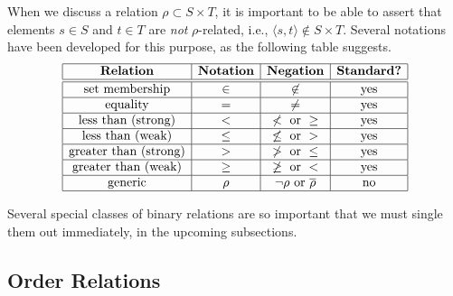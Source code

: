 \noindent
When we discuss a relation $\rho \subset S \times T$, it is important
to be able to assert that elements $s \in S$ and $t \in T$ are {\em
  not} $\rho$-related, i.e., $\langle s, t
\rangle \not\in S \times T$.  Several notations have been developed
for this purpose, as the following table suggests.
\begin{equation}
\label{eq:NOT-rho-notation}
\begin{array}{|c|c|c|c|}
\hline
\mbox{\bf Relation} & \mbox{\bf Notation} & \mbox{\bf Negation} &
\mbox{\bf Standard?} \\
\hline
\hline
\mbox{set membership} & \in & \not\in & \mbox{yes} \\
\hline
\mbox{equality}       & =   & \neq    & \mbox{yes} \\
\hline
\mbox{less than (strong)} & < & \not < \mbox{ or } \geq & \mbox{yes} \\
\hline
\mbox{less than (weak)} & \leq & \not\leq \mbox{ or } > & \mbox{yes} \\
\hline
\mbox{greater than (strong)} & > & \not > \mbox{ or } \leq & \mbox{yes} \\
\hline
\mbox{greater than (weak)} & \geq & \not\geq \mbox{ or } < & \mbox{yes} \\
\hline
\mbox{generic}  & \rho  & \neg\rho \mbox{ or } \overline{\rho} &
\mbox{no} \\
\hline
\end{array}
\end{equation}

\medskip

Several special classes of binary relations are so important that we
must single them out immediately, in the upcoming subsections.


\subsection{Order Relations}
\label{sec:order-relation}

